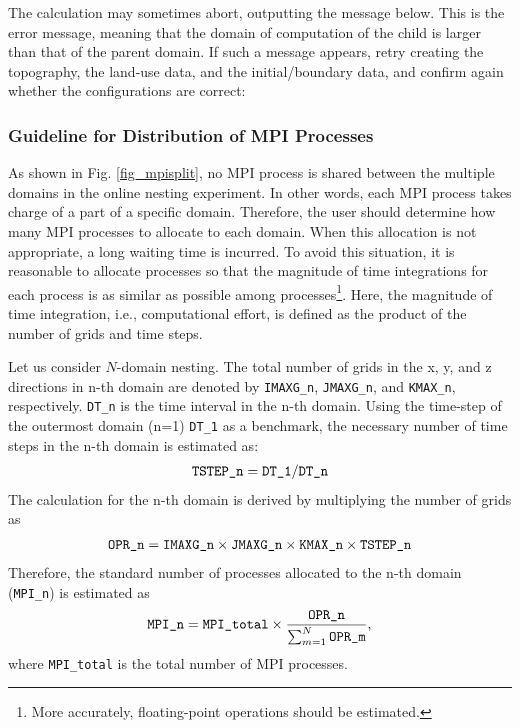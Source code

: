 The calculation may sometimes abort, outputting the message below. This is the error message, meaning that the domain of computation of the child  is larger than that of the parent domain. If such a message appears, retry creating the topography, the land-use data, and the initial/boundary data, and confirm again whether the configurations are correct:


\subsubsection{Guideline for Distribution of MPI Processes}

As shown in Fig. \ref{fig_mpisplit}, no MPI process is shared between the multiple domains in the online nesting experiment. In other words, each MPI process takes charge of a part of a specific domain. Therefore, the user should determine how many MPI processes to allocate to each domain. When this allocation is not appropriate, a long waiting time is incurred. To avoid this situation, it is reasonable to allocate processes so that the magnitude of time integrations for each process is as similar as possible among processes\footnote{More accurately, floating-point operations should be estimated.}. Here, the magnitude of time integration, i.e., computational effort, is defined as the product of the number of grids and time steps.

Let us consider $N$-domain nesting. The total number of grids in the x, y, and z directions in n-th domain are denoted by
\verb|IMAXG_n|, \verb|JMAXG_n|, and \verb|KMAX_n|, respectively.
\verb|DT_n| is the time interval  in the n-th domain.
Using the time-step of the outermost domain (n=1) \verb|DT_1| as a benchmark,
the necessary number of time steps in the n-th domain is estimated as:
\begin{eqnarray}
 \verb|TSTEP_n| = \verb|DT_1| / \verb|DT_n|  \nonumber
\end{eqnarray}
The calculation for the n-th domain is derived by multiplying the number of grids as
\begin{eqnarray}
 \verb|OPR_n| = \verb|IMAXG_n| \times \verb|JMAXG_n| \times \verb|KMAX_n| \times \verb|TSTEP_n| \nonumber
\end{eqnarray}
Therefore, the standard number of processes allocated to the n-th domain (\verb|MPI_n|) is estimated as
\begin{eqnarray}
 \verb|MPI_n| = \verb|MPI_total| \times \frac{ \texttt{OPR\_n} }{ \sum_{m=1}^N \texttt{OPR\_m} },
\end{eqnarray}
where \verb|MPI_total| is the total number of MPI processes.

